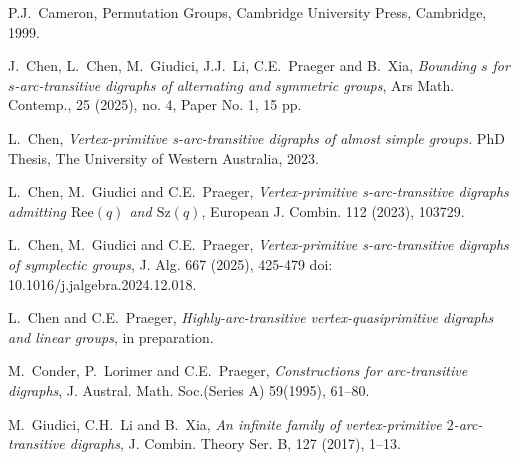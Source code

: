 \documentclass[11pt]{amsart}
\newcommand{\Sz}{\mathrm{Sz}}
\newcommand{\Ree}{\mathrm{Ree}}
\begin{document}
\begin{thebibliography}{}

 P.J.~Cameron, Permutation Groups, Cambridge University Press, Cambridge, 1999.



 J.~Chen, L.~Chen, M.~Giudici, J.J.~Li, C.E.~Praeger and B.~Xia, \emph{Bounding $s$ for $s$-arc-transitive digraphs of alternating and symmetric groups},  Ars Math. Contemp., 25 (2025), no. 4, Paper No. 1, 15 pp.

 L.~Chen,  \emph{Vertex-primitive s-arc-transitive digraphs of almost simple groups.} PhD Thesis, The University of Western Australia, 2023.

 L.~Chen, M.~Giudici and C.E.~Praeger, \emph{Vertex-primitive s-arc-transitive digraphs admitting \(\Ree(q)\) and \(\Sz(q)\)}, European J. Combin. 112 (2023), 103729.

 L.~Chen, M.~Giudici and C.E.~Praeger, \emph{Vertex-primitive s-arc-transitive digraphs of symplectic groups}, J. Alg. 667 (2025),  425-479   doi: 10.1016/j.jalgebra.2024.12.018.

 L.~Chen and C.E.~Praeger, \emph{Highly-arc-transitive vertex-quasiprimitive digraphs and linear groups}, in preparation.


 M.~Conder, P.~Lorimer and C.E.~Praeger, \emph{Constructions for arc-transitive digraphs}, J. Austral. Math. Soc.(Series A) 59(1995), 61--80.





 M.~Giudici, C.H.~Li and B.~Xia, \emph{An infinite family of vertex-primitive \(2\)-arc-transitive digraphs}, J. Combin. Theory Ser. B, 127 (2017), 1--13.


\end{thebibliography}
\end{document}
